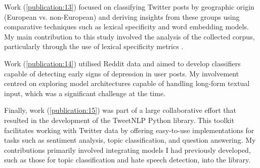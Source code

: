 Work (\ref{publication:13}) focused on classifying Twitter posts by geographic origin (European vs. non-European) and deriving insights from these groups using comparative techniques such as lexical specificity and word embedding models. My main contribution to this study involved the analysis of the collected corpus, particularly through the use of lexical specificity metrics \cite{camacho2016nasari}.

Work (\ref{publication:14}) utilised Reddit data and aimed to develop classifiers capable of detecting early signs of depression in user posts. My involvement centred on exploring model architectures capable of handling long-form textual input, which was a significant challenge at the time.

Finally, work (\ref{publication:15}) was part of a large collaborative effort that resulted in the development of the TweetNLP Python library. This toolkit facilitates working with Twitter data by offering easy-to-use implementations for tasks such as sentiment analysis, topic classification, and question answering. My contributions primarily involved integrating models I had previously developed, such as those for topic classification and hate speech detection, into the library.


